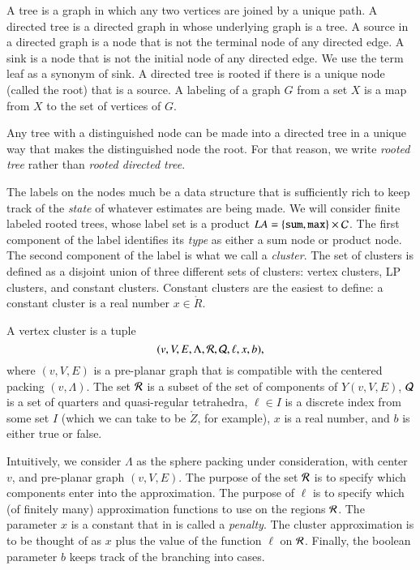 
\begin{definition}
A tree is a graph in which any two vertices are joined by a unique path.
A directed tree is a directed graph in whose underlying graph is a tree.
A source in a directed graph is a node that is not the terminal node
of any directed edge.  A sink is a node that is not the initial node
of any directed edge.  We use the term leaf as a synonym of sink.
A directed tree is rooted if there is a unique node (called
the root) that is a source.
A labeling of a graph $G$ from a set $X$ is a map from $X$ to the set
of vertices of $G$.
\end{definition}

Any tree with a distinguished node can be made into a directed
tree in a unique way that makes the distinguished node the root. 
For that reason, we write {\it rooted tree} rather than
{\it rooted directed tree}.

The labels on the nodes much be a data structure that is sufficiently
rich to keep track of the {\it state} of whatever estimates are
being made.
We will consider finite labeled rooted trees, whose label set
is a product $LA=\{{\tt sum, max}\} \times {\cal C}$.   The first
component of the label identifies its {\it type} as either a sum
node or product node. 
The second component of the label is what we call a {\it cluster}.
The set of clusters is defined as a disjoint union of three different sets
of clusters:  vertex clusters, LP clusters, and constant clusters.
Constant clusters are the easiest to define: a constant cluster
is a real number $x\in\ring{R}$.  

\begin{definition}
A vertex
cluster is a tuple
    $$
    (v,V,E,\Lambda,{\cal R},{\cal Q},\ell,x,b),
    $$
where $(v,V,E)$ is a pre-planar graph that is compatible with
the centered packing $(v,\Lambda)$.  %
The set ${\cal R}$ is a subset of the set of components of $Y(v,V,E)$,
${\cal Q}$ is a set of quarters and quasi-regular tetrahedra,
$\ell\in I$ is a discrete index from some set $I$ (which we can
take to be $\ring{Z}$, for example), 
$x$ is a real number, and
$b$ is either true or false.
\end{definition}

Intuitively, we consider $\Lambda$ as the sphere packing under
consideration, with center $v$, and pre-planar graph $(v,V,E)$.
The purpose of the set ${\cal R}$ is to specify which components
enter into the approximation.  The purpose of $\ell$ is to specify
which (of finitely many) approximation functions to use on the
regions ${\cal R}$.  The parameter $x$ is a constant that in \cite{DCG}
is called a {\it penalty}.  The cluster approximation is to be
thought of as $x$ plus the value of the function $\ell$ on ${\cal R}$.
Finally, the boolean parameter $b$ keeps track of the branching into
cases.

